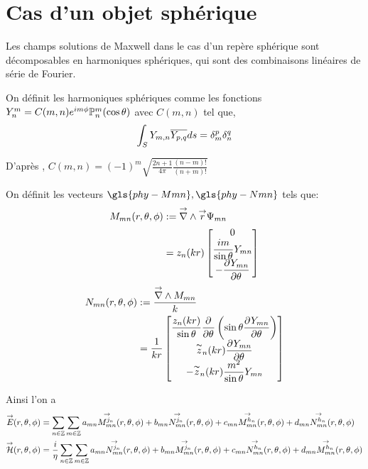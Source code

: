 \section{Cas d'un objet sphérique}

    Les champs solutions de Maxwell dans le cas d'un repère sphérique sont décomposables en harmoniques sphériques, qui sont des combinaisons linéaires de série de Fourier. 

    On définit les harmoniques sphériques comme les fonctions \(Y_n^m = C(m,n) e^{im\phi}\mathbb{P}^m_n(\cos \theta) \) avec \(C(m,n)\) tel que,
    \[
     \displaystyle\int_S Y_{m,n} {\overline{Y_{p,q}}} ds = \delta_m^p \delta_n^q
    \]

    D’après \cite[p.~24]{nedelec_acoustic_2001}, \( C(m,n) = (-1)^m\sqrt{\frac{2n+1}{4\pi}\frac{(n-m)!}{(n+m)!}}\)

    On définit les vecteurs \(\gls{phy-Mmn} ,\gls{phy-Nmn}\) tels que:
    \begin{align}
     \label{eq:defMmn}
      M_{mn}(r,\theta,\phi) &:= {\overset{\rightarrow}{\nabla}}\wedge {\overset{\rightarrow}{r}} \Psi_{mn} \\
      &= z_n(kr)
      \begin{bmatrix}
        0 \\ \dfrac{im}{\sin\theta}Y_{mn}\\
        - \dfrac{\partial^{{}} Y_{mn}}{{\partial \theta}^{{}}}
      \end{bmatrix}
    \end{align}
    \begin{align}
    \label{eq:defmnn}
      N_{mn}(r,\theta,\phi) &:= \dfrac{{\overset{\rightarrow}{\nabla}}\wedge M_{mn}}{k} \\
      &= \dfrac{1}{kr}\begin{bmatrix}
        \dfrac{z_n(kr)}{\sin\theta}\dfrac{\partial^{{}} }{{\partial \theta}^{{}}}\left(\sin\theta\dfrac{\partial^{{}} Y_{mn}}{{\partial \theta}^{{}}}\right)\\
        \overset{\thicksim}{z}_n(kr)\dfrac{\partial^{{}} Y_{mn}}{{\partial \theta}^{{}}}\\
        -\overset{\thicksim}{z}_n(kr)\dfrac{m^2}{\sin\theta}Y_{mn}\\
      \end{bmatrix}
    \end{align}

    Ainsi l'on a 
    \begin{align}
        {\overset{\rightarrow}{E}}(r,\theta,\phi) &= \sum_{n\in\mathbb Z}\sum_{m\in\mathbb Z} a_{mn} {\overset{\rightarrow}{M_{mn}^{j_n}}}(r,\theta,\phi) + b_{mn} {\overset{\rightarrow}{N_{mn}^{j_n}}}(r,\theta,\phi) + c_{mn} {\overset{\rightarrow}{M_{mn}^{h_n}}}(r,\theta,\phi) + d_{mn} {\overset{\rightarrow}{N_{mn}^{h_n}}}(r,\theta,\phi)
        \\
        {\overset{\rightarrow}{\mathcal{H}}}(r,\theta,\phi) &= \dfrac{i}{\eta}\sum_{n\in\mathbb Z}\sum_{m\in\mathbb Z} a_{mn} {\overset{\rightarrow}{N_{mn}^{j_n}}}(r,\theta,\phi) + b_{mn} {\overset{\rightarrow}{M_{mn}^{j_n}}}(r,\theta,\phi) + c_{mn} {\overset{\rightarrow}{N_{mn}^{h_n}}}(r,\theta,\phi) + d_{mn} {\overset{\rightarrow}{M_{mn}^{h_n}}}(r,\theta,\phi)
    \end{align}